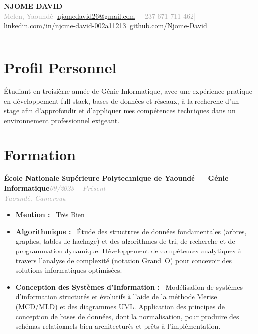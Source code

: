 \documentclass[10pt, a4paper]{article}
\newcommand{\entryhead}[2]{%
  \noindent\textbf{#1}\hfill{\small\textit{\textcolor{darkgray}{#2}}}\\[-4pt]%
}
\newcommand{\entrysub}[1]{%
  {\small\textit{\textcolor{darkgray}{#1}}}\\[2pt]%
}
\newcommand{\blabel}[1]{\textbf{#1}\ }
\begin{document}

{\LARGE\bfseries\color{navyblue} NJOME DAVID}\\[4pt]
{\small\textcolor{darkgray}{%
  Melen, Yaoundé\quad|\quad
  \href{mailto:njomedavid26@gmail.com}{njomedavid26@gmail.com}\quad|\quad
  +237 671 711 462\quad|\quad
  \href{https://www.linkedin.com/in/njome-david-002a11213}{linkedin.com/in/njome-david-002a11213}\quad|\quad
  \href{https://github.com/Njome-David}{github.com/Njome-David}
}}

\vspace{4pt}
\textcolor{navyblue}{\rule{\linewidth}{1.8pt}}
\vspace{2pt}

\section{Profil Personnel}

Étudiant en troisième année de Génie Informatique, avec une expérience pratique en développement
full-stack, bases de données et réseaux, à la recherche d'un stage afin d'approfondir et d'appliquer
mes compétences techniques dans un environnement professionnel exigeant.

\section{Formation}

\entryhead{École Nationale Supérieure Polytechnique de Yaoundé — Génie Informatique}{09/2023 -- Présent}
\entrysub{Yaoundé, Cameroun}
\begin{itemize}
  \item \blabel{Mention :} Très Bien
  \item \blabel{Algorithmique :} Étude des structures de données fondamentales (arbres, graphes,
        tables de hachage) et des algorithmes de tri, de recherche et de programmation dynamique.
        Développement de compétences analytiques à travers l'analyse de complexité (notation Grand~O)
        pour concevoir des solutions informatiques optimisées.
  \item \blabel{Conception des Systèmes d'Information :} Modélisation de systèmes d'information
        structurés et évolutifs à l'aide de la méthode Merise (MCD/MLD) et des diagrammes UML.
        Application des principes de conception de bases de données, dont la normalisation, pour
        produire des schémas relationnels bien architecturés et prêts à l'implémentation.
\end{itemize}
\end{document}
